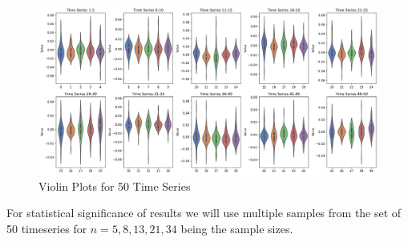 \begin{figure}[H]
  \centering
  \includegraphics[width=\textwidth]{images/violin_plots_50_timeseries.png}
  \caption{Violin Plots for 50 Time Series}
  \label{fig:violin_plots}
\end{figure}


For statistical significance of results we will use multiple samples from the set of 50 timeseries for $n = 5,8,13,21,34$ being the sample sizes.

































